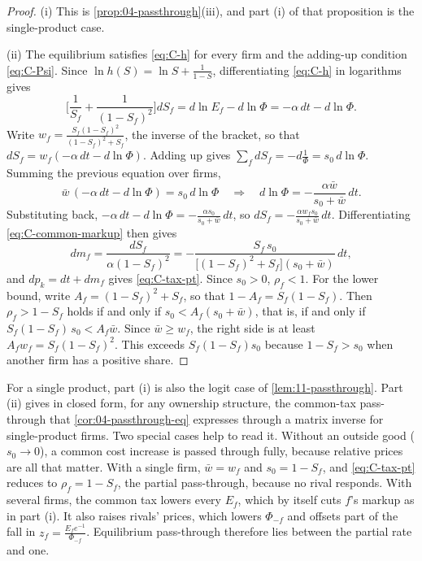 \begin{proof}
(i) This is \cref{prop:04-passthrough}(iii), and part (i) of that proposition is the single-product case.

(ii) The equilibrium satisfies \eqref{eq:C-h} for every firm and the adding-up condition \eqref{eq:C-Psi}. Since
$\ln h(S) = \ln S + \frac{1}{1 - S}$, differentiating \eqref{eq:C-h} in logarithms gives
\begin{equation*}
  \Big[\frac{1}{S_f} + \frac{1}{(1 - S_f)^2}\Big]dS_f = d\ln E_f - d\ln\Phi = -\alpha\,dt - d\ln\Phi .
\end{equation*}
Write $w_f = \frac{S_f(1 - S_f)^2}{(1 - S_f)^2 + S_f}$, the inverse of the bracket, so that
$dS_f = w_f(-\alpha\,dt - d\ln\Phi)$. Adding up gives $\sum_fdS_f = -d\frac{1}{\Phi} = s_0\,d\ln\Phi$. Summing the
previous equation over firms,
\begin{equation*}
  \bar w\,(-\alpha\,dt - d\ln\Phi) = s_0\,d\ln\Phi
  \quad\Longrightarrow\quad
  d\ln\Phi = -\frac{\alpha\bar w}{s_0 + \bar w}\,dt .
\end{equation*}
Substituting back, $-\alpha\,dt - d\ln\Phi = -\frac{\alpha s_0}{s_0 + \bar w}\,dt$, so
$dS_f = -\frac{\alpha w_fs_0}{s_0 + \bar w}\,dt$. Differentiating \eqref{eq:C-common-markup} then gives
\begin{equation*}
  dm_f = \frac{dS_f}{\alpha(1 - S_f)^2} = -\frac{S_f\,s_0}{\big[(1 - S_f)^2 + S_f\big](s_0 + \bar w)}\,dt ,
\end{equation*}
and $dp_k = dt + dm_f$ gives \eqref{eq:C-tax-pt}. Since $s_0 > 0$, $\rho_f < 1$. For the lower bound, write
$A_f = (1 - S_f)^2 + S_f$, so that $1 - A_f = S_f(1 - S_f)$. Then $\rho_f > 1 - S_f$ holds if and only if
$s_0 < A_f(s_0 + \bar w)$, that is, if and only if $S_f(1 - S_f)\,s_0 < A_f\bar w$. Since $\bar w \ge w_f$, the right
side is at least $A_fw_f = S_f(1 - S_f)^2$. This exceeds $S_f(1 - S_f)s_0$ because $1 - S_f > s_0$ when another firm
has a positive share.
\end{proof}

For a single product, part (i) is also the logit case of \cref{lem:11-passthrough}. Part (ii) gives in closed form, for any ownership structure, the common-tax pass-through
that \cref{cor:04-passthrough-eq} expresses through a matrix inverse for single-product firms. Two special cases help
to read it. Without an outside good ($s_0 \to 0$), a common cost increase is
passed through fully, because relative prices are all that matter. With a single firm, $\bar w = w_f$ and
$s_0 = 1 - S_f$, and \eqref{eq:C-tax-pt} reduces to $\rho_f = 1 - S_f$, the partial pass-through, because no rival
responds. With several firms, the common tax lowers every $E_f$, which by itself cuts $f$'s markup as in part (i). It
also raises rivals' prices, which lowers $\Phi_{-f}$ and offsets part of the fall in $z_f = \frac{E_fe^{-1}}{\Phi_{-f}}$.
Equilibrium pass-through therefore lies between the partial rate and one.

